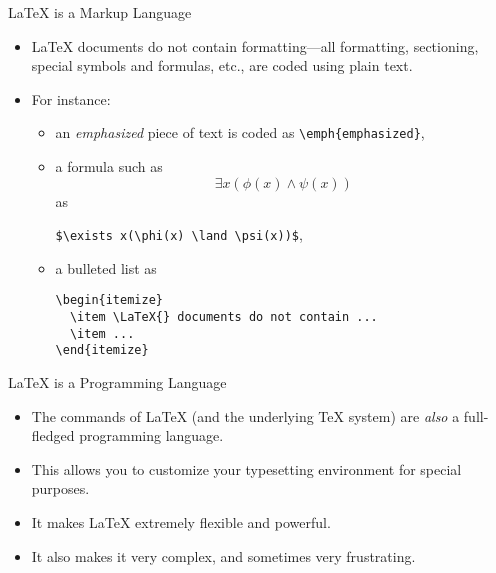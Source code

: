 \begin{frame}[fragile]{\LaTeX{} is a Markup Language}

\begin{itemize}
\item \LaTeX{} documents do not contain formatting---all formatting,
  sectioning, special symbols and formulas, etc., are coded using
  plain text.
\item For instance:
  \begin{itemize}
    \item an \emph{emphasized} piece of text is coded as
      \verb+\emph{emphasized}+,
    \item a formula such as \[\exists x(\phi(x) \land \psi(x))\] as
      \begin{center}
      \verb+$\exists x(\phi(x) \land \psi(x))$+,
      \end{center}
    \item a bulleted list as 
\begin{verbatim}
\begin{itemize}
  \item \LaTeX{} documents do not contain ...
  \item ...
\end{itemize}
\end{verbatim}
  \end{itemize}
\end{itemize}

\end{frame}

\begin{frame}{\LaTeX{} is a Programming Language}

\begin{itemize}
\item The commands of \LaTeX{} (and the underlying \TeX{} system) are
  \emph{also} a full-fledged programming language.
\item This allows you to customize your typesetting environment for
  special purposes.
\item It makes \LaTeX{} extremely flexible and powerful.
\item It also makes it very complex, and sometimes very frustrating.
\end{itemize}
\end{frame}

